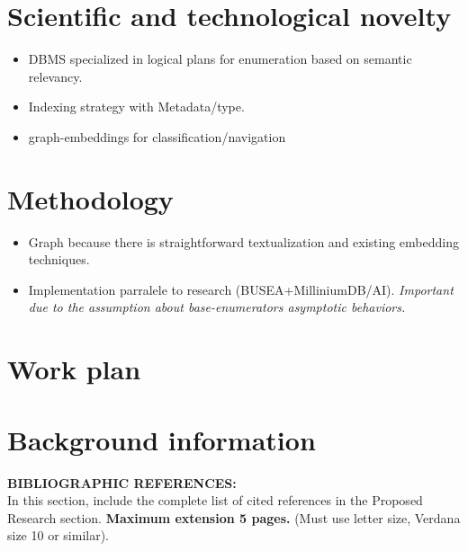 \documentclass[10pt]{article}
\begin{document}
\section{Scientific and technological novelty}

\begin{itemize}
    \item DBMS specialized in logical plans for enumeration based on semantic relevancy.
    \item Indexing strategy with Metadata/type.
    \item graph-embeddings for classification/navigation
\end{itemize}

\section{Methodology}
\begin{itemize}
    \item Graph because there is straightforward textualization and existing embedding techniques.
    \item Implementation parralele to research (BUSEA+MilliniumDB/AI). \textit{Important due to the assumption about base-enumerators asymptotic behaviors.}
\end{itemize}



\section{Work plan}
\section{Background information}



\newpage

\noindent
\textbf{BIBLIOGRAPHIC REFERENCES:} \\
In this section, include the
complete list of cited references in the Proposed Research
section. {\bf Maximum extension 5 pages.} (Must use letter size, Verdana
size 10 or similar).
\\
\\
\end{document}
